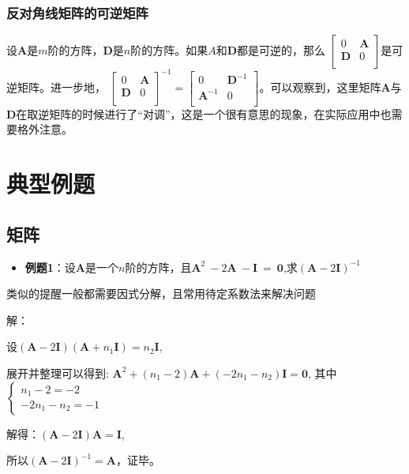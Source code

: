 \documentclass{ctexart}
\begin{document}
            \subsubsection{反对角线矩阵的可逆矩阵}
            设$\mathbf{A}$是$m$阶的方阵，$\mathbf{D}$是$n$阶的方阵。如果$A$和$\mathbf{D}$都是可逆的，那么
            $\begin{bmatrix}
                0 & \mathbf{A} \\
                \mathbf{D} & 0 \\
            \end{bmatrix}$是可逆矩阵。进一步地，
            $
            \begin{bmatrix}
                0 & \mathbf{A} \\
                \mathbf{D} & 0 \\
            \end{bmatrix}^{-1} = \begin{bmatrix}
                0 & \mathbf{D}^{-1} \\
                \mathbf{A}^{-1} & 0 \\
            \end{bmatrix}
            $。可以观察到，这里矩阵$\mathbf{A}$与$\mathbf{D}$在取逆矩阵的时候进行了“对调”，这是一个很有意思的现象，在实际应用中也需要格外注意。
    \section{典型例题}
            \subsection{矩阵}
            \begin{itemize}
                \item \textbf{例题1}：设$\mathbf{A}$是一个$n$阶的方阵，且$\mathbf{A}^2~-2\mathbf{A}~-\mathbf{I}~=~\mathbf{0}$,求$(\mathbf{A}-2\mathbf{I})^{-1}$
            \end{itemize}
            
            {\fangsong 类似的提醒一般都需要因式分解，且常用待定系数法来解决问题}\\
            \begin{mdframed}
            解：

            设$(\mathbf{A}-2\mathbf{I})(\mathbf{A}+n_1\mathbf{I})=n_2\mathbf{I}$,
            
            展开并整理可以得到:
            $\mathbf{A}^2+(n_1-2)\mathbf{A}+(-2n_1-n_2)\mathbf{I}=\mathbf{0}$,
            其中$\begin{cases}
                n_1-2=-2\\
                -2n_1-n_2=-1
            \end{cases}$
            
            解得：$(\mathbf{A}-2\mathbf{I})\mathbf{A}=\mathbf{I}$,
            
            所以$(\mathbf{A}-2\mathbf{I})^{-1} = \mathbf{A}$，证毕。
            
            \end{mdframed}
\end{document}
